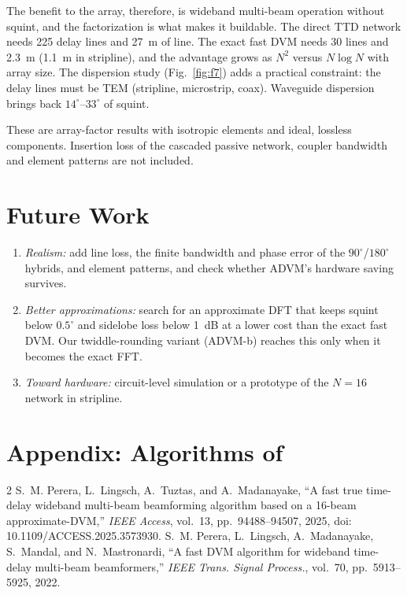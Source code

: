 \documentclass[conference]{IEEEtran}
\begin{document}
The benefit to the array, therefore, is wideband multi-beam operation without squint, and the factorization is what makes it buildable. The direct TTD network needs 225 delay lines and 27~m of line. The exact fast DVM needs 30 lines and 2.3~m (1.1~m in stripline), and the advantage grows as $N^2$ versus $N\log N$ with array size. The dispersion study (Fig.~\ref{fig:f7}) adds a practical constraint: the delay lines must be TEM (stripline, microstrip, coax). Waveguide dispersion brings back $14^\circ$--$33^\circ$ of squint.

These are array-factor results with isotropic elements and ideal, lossless components. Insertion loss of the cascaded passive network, coupler bandwidth and element patterns are not included.

\section{Future Work}
\begin{enumerate}
\item \emph{Realism:} add line loss, the finite bandwidth and phase error of the $90^\circ$/$180^\circ$ hybrids, and element patterns, and check whether ADVM's hardware saving survives.
\item \emph{Better approximations:} search for an approximate DFT that keeps squint below $0.5^\circ$ and sidelobe loss below 1~dB at a lower cost than the exact fast DVM. Our twiddle-rounding variant (ADVM-b) reaches this only when it becomes the exact FFT.
\item \emph{Toward hardware:} circuit-level simulation or a prototype of the $N=16$ network in stripline.
\end{enumerate}

\appendix
\section*{Appendix: Algorithms of~\cite{perera2025}}


\begin{thebibliography}{2}
S.~M. Perera, L.~Lingsch, A.~Tuztas, and A.~Madanayake, ``A fast true time-delay wideband multi-beam beamforming algorithm based on a 16-beam approximate-DVM,'' \emph{IEEE Access}, vol.~13, pp.~94488--94507, 2025, doi: 10.1109/ACCESS.2025.3573930.
S.~M. Perera, L.~Lingsch, A.~Madanayake, S.~Mandal, and N.~Mastronardi, ``A fast DVM algorithm for wideband time-delay multi-beam beamformers,'' \emph{IEEE Trans. Signal Process.}, vol.~70, pp.~5913--5925, 2022.
\end{thebibliography}
\end{document}
